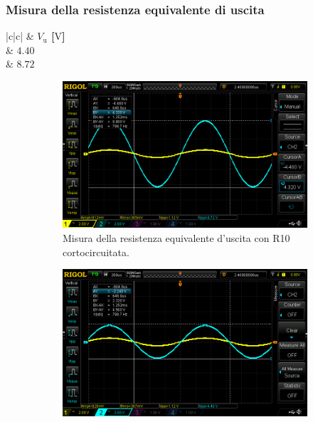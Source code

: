 \documentclass[a4paper]{article}
\begin{document}
			\subsubsection{Misura della resistenza equivalente di uscita}	
				\begin{center}
					\begin{tabular}{ |c|c| }
						\hline
						\multirow{} 						  & \textbf{$ V_{\mathrm{u}} $ [$ \mathrm{V} $]} \\
						\hline
								  & $ 4.40 $ \\
						 & $ 8.72 $ \\
						\hline
					\end{tabular}
				\end{center}
				\begin{figure}[h!]
					\centering
					\begin{subfigure}{0.4\textwidth}
						\centering
						\includegraphics[scale=0.2]{misuraDellaResistenzaEquivalenteInIngressoAmplificatoreNonInvertenteR9InCorto}
						\caption{Misura della resistenza equivalente d'uscita con R10 cortocircuitata.}
					\end{subfigure}
					\begin{subfigure}{0.4\textwidth}
						\centering
						\includegraphics[scale=0.2]{misuraDellaResistenzaEquivalenteDiUscitaAmplificatoreNonInvertenteR10Inserita}

\end{subfigure}
\end{figure}
\end{document}
